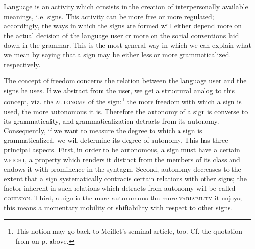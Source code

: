 Language is an activity which consists in the creation of interpersonally available meanings, i.e. signs. This activity can be more free or more regulated; accordingly, the ways in which the signs are formed will either depend more on the actual decision of the language user or more on the social conventions laid down in the grammar. This is the most general way in which we can explain what we mean by saying that a sign may be either less or more grammaticalized, respectively.

The concept of freedom concerns the relation between the language user and the signs he uses. If we abstract from the user, we get a structural analog to this concept, viz. the \textsc{autonomy} of the sign:\footnote{This notion may go back to Meillet's seminal article, too. Cf. the quotation from \citet[131]{Meillet1912} on p. \pageref{meillet} above.} the more freedom with which a sign is used, the more autonomous it is. Therefore the autonomy of a sign is converse to its grammaticality, and grammaticalization detracts from its autonomy. Consequently, if we want to measure the degree to which a sign is grammaticalized, we will determine its degree of autonomy. This has three principal aspects. First, in order to be autonomous, a sign must have a certain \textsc{weight}, a property which renders it distinct from the members of its class and endows it with prominence in the syntagm. Second, autonomy decreases to the extent that a sign systematically contracts certain relations with other signs; the factor inherent in such relations which detracts from autonomy will be called \textsc{cohesion}. Third, a sign is the more autonomous the more \textsc{variability} it enjoys; this means a momentary mobility or shiftability with respect to other signs.


